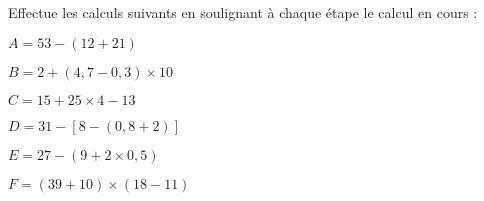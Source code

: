 \begin{exercice}
Effectue les calculs suivants en soulignant à chaque étape le calcul en cours :
 \begin{colitemize}{2}
 \item $A = 53 - (12 + 21)$	
 
 \dotfill

 \dotfill

 \dotfill

 \item {\small $B = 2 + (4,7 - 0,3) \times 10$}	

 \dotfill

 \dotfill

 \dotfill
	
 \item $C= 15 + 25 \times 4 - 13$      	

 \dotfill

 \dotfill

 \dotfill
	
 \item {\small $D = 31 - [8 - (0,8 + 2)]$}
	
 \dotfill

 \dotfill

 \dotfill
	
 \item $E = 27 - (9 + 2 \times 0,5)$	

 \dotfill

 \dotfill

 \dotfill
	
 \item {\small $F = (39 + 10) \times (18 - 11)$}
 
 \dotfill

 \dotfill

 \dotfill
\end{colitemize}
\end{exercice}


